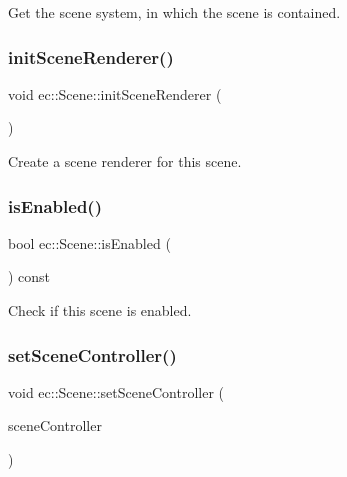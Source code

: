 Get the scene system, in which the scene is contained. 

\mbox{\label{classec_1_1_scene_a137505b25a213810b1b477ad13daca7f}} 
\subsubsection{\texorpdfstring{init\+Scene\+Renderer()}{initSceneRenderer()}}
{\footnotesize\ttfamily void ec\+::\+Scene\+::init\+Scene\+Renderer (\begin{DoxyParamCaption}{ }\end{DoxyParamCaption})\hspace{0.3cm}{\ttfamily [protected]}}



Create a scene renderer for this scene. 

\mbox{\label{classec_1_1_scene_a0748d645ee5204e64d674c1b10b26864}} 
\subsubsection{\texorpdfstring{is\+Enabled()}{isEnabled()}}
{\footnotesize\ttfamily bool ec\+::\+Scene\+::is\+Enabled (\begin{DoxyParamCaption}{ }\end{DoxyParamCaption}) const}



Check if this scene is enabled. 

\mbox{\label{classec_1_1_scene_a8c3bc6848957704f9f45508c13133a91}} 
\subsubsection{\texorpdfstring{set\+Scene\+Controller()}{setSceneController()}}
{\footnotesize\ttfamily void ec\+::\+Scene\+::set\+Scene\+Controller (\begin{DoxyParamCaption}\item[{\mbox{\hyperlink{classec_1_1_scene_controller}{Scene\+Controller}} $\ast$}]{scene\+Controller }\end{DoxyParamCaption})}



